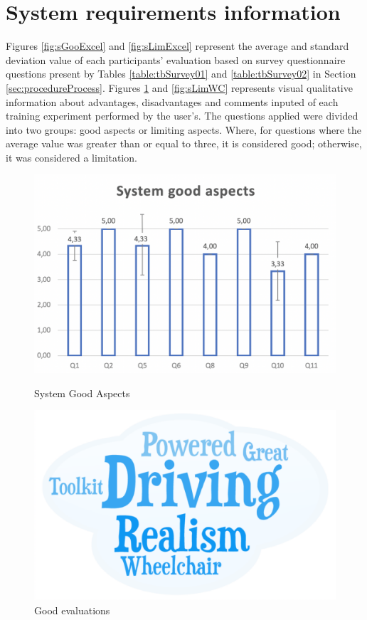 \section{System requirements information}
Figures \ref{fig:sGooExcel} and  \ref{fig:sLimExcel} represent  the average and standard deviation value of each participants’ evaluation based on survey questionnaire questions present by Tables \ref{table:tbSurvey01} and \ref{table:tbSurvey02} in Section \ref{sec:procedureProcess}.  Figures  \ref{fig:sGooWC} and \ref{fig:sLimWC} represents visual qualitative information about advantages, disadvantages and comments inputed of each training experiment performed by the user's. The questions applied were divided into two groups: good aspects or limiting aspects. Where, for questions where the average value was greater than or equal to three, it is considered good; otherwise, it was considered a limitation.

\begin{figure}[!htbp]
\center
\begin{minipage}{0.495\linewidth}
\center
\captionsetup{justification=centering,margin=0.5cm,font=small}
\includegraphics[width=1\linewidth]{img/cap6/sGoodAspExcel}
\caption{System Good Aspects} \label{fig:sGooExcel}
\end{minipage}
\begin{minipage}{0.495\linewidth}
\center
\captionsetup{justification=centering,margin=0cm,font=small}
\includegraphics[width=1\linewidth]{img/cap6/sGoodAspWordClouds}
\caption{Good evaluations} \label{fig:sGooWC}
\end{minipage}
\end{figure}


